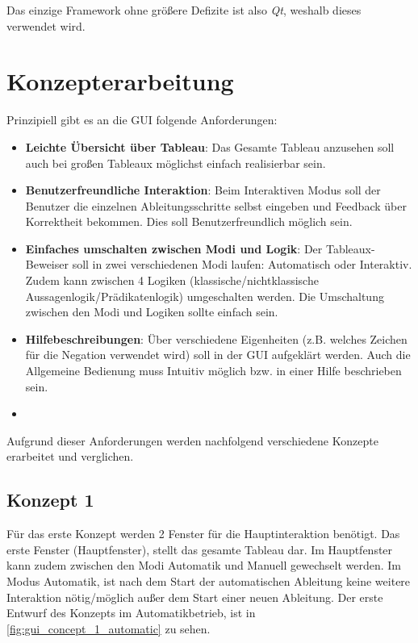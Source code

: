 Das einzige Framework ohne größere Defizite ist also \textit{Qt}, weshalb dieses verwendet wird.

\section{Konzepterarbeitung}
Prinzipiell gibt es an die \ac{GUI} folgende Anforderungen:
\begin{itemize}
\item \textbf{Leichte Übersicht über Tableau}: Das Gesamte Tableau anzusehen soll auch bei großen Tableaux möglichst einfach realisierbar sein.

\item \textbf{Benutzerfreundliche Interaktion}: Beim Interaktiven Modus soll der Benutzer die einzelnen Ableitungsschritte selbst eingeben und Feedback über Korrektheit bekommen. Dies soll Benutzerfreundlich möglich sein.

\item \textbf{Einfaches umschalten zwischen Modi und Logik}: Der Tableaux-Beweiser soll in zwei verschiedenen Modi laufen: Automatisch oder Interaktiv. Zudem kann zwischen 4 Logiken (klassische/nichtklassische Aussagenlogik/Prädikatenlogik) umgeschalten werden. Die Umschaltung zwischen den Modi und Logiken sollte einfach sein.

\item \textbf{Hilfebeschreibungen}: Über verschiedene Eigenheiten (z.B. welches Zeichen für die Negation verwendet wird) soll in der \ac{GUI} aufgeklärt werden. Auch die Allgemeine Bedienung muss Intuitiv möglich bzw. in einer Hilfe beschrieben sein.

\item \textbf{}
\end{itemize}

Aufgrund dieser Anforderungen werden nachfolgend verschiedene Konzepte erarbeitet und verglichen.

\subsection{Konzept 1}
Für das erste Konzept werden 2 Fenster für die Hauptinteraktion benötigt. Das erste Fenster (Hauptfenster), stellt das gesamte Tableau dar. Im Hauptfenster kann zudem zwischen den Modi Automatik und Manuell gewechselt werden. Im Modus Automatik, ist nach dem Start der automatischen Ableitung keine weitere Interaktion nötig/möglich außer dem Start einer neuen Ableitung. Der erste Entwurf des Konzepts im Automatikbetrieb, ist in \autoref{fig:gui_concept_1_automatic} zu sehen.

